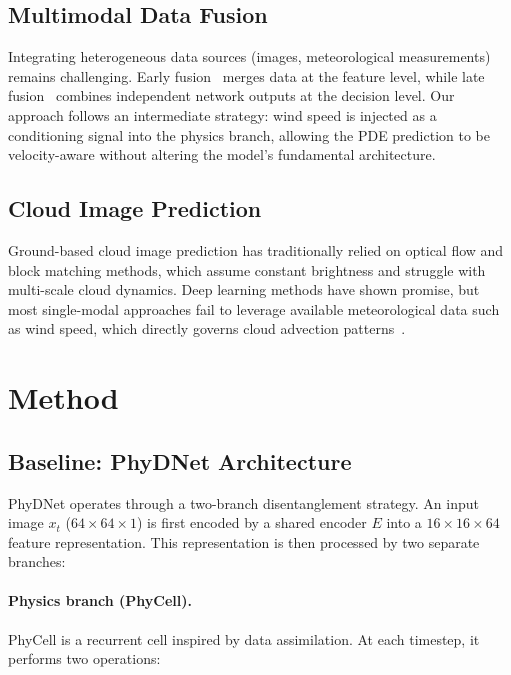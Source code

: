 \documentclass[11pt,a4paper]{article}
\begin{document}
\subsection{Multimodal Data Fusion}

Integrating heterogeneous data sources (images, meteorological measurements) remains challenging. Early fusion~\cite{snoek2005early} merges data at the feature level, while late fusion~\cite{dmello2015review} combines independent network outputs at the decision level. Our approach follows an intermediate strategy: wind speed is injected as a conditioning signal into the physics branch, allowing the PDE prediction to be velocity-aware without altering the model's fundamental architecture.

\subsection{Cloud Image Prediction}

Ground-based cloud image prediction has traditionally relied on optical flow and block matching methods, which assume constant brightness and struggle with multi-scale cloud dynamics. Deep learning methods have shown promise, but most single-modal approaches fail to leverage available meteorological data such as wind speed, which directly governs cloud advection patterns~\cite{zhang2024multiscale}.

\section{Method}
\label{sec:method}

\subsection{Baseline: PhyDNet Architecture}
\label{sec:baseline}

PhyDNet operates through a two-branch disentanglement strategy. An input image $x_t$ ($64 \times 64 \times 1$) is first encoded by a shared encoder $E$ into a $16 \times 16 \times 64$ feature representation. This representation is then processed by two separate branches:

\paragraph{Physics branch (PhyCell).}
PhyCell is a recurrent cell inspired by data assimilation. At each timestep, it performs two operations:
\end{document}
